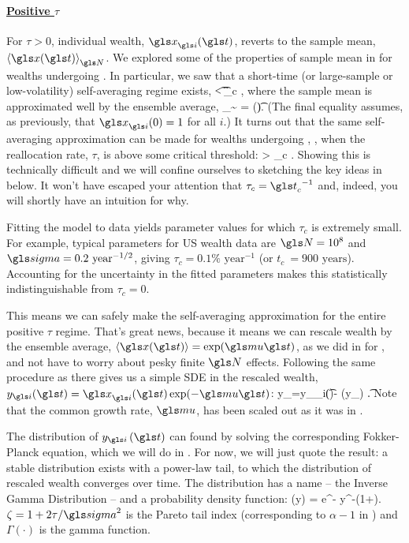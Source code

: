 \paragraph{\underline{Positive $\tau$}}
\mbox{}

For $\tau>0$, individual wealth, $\x_\gi(\t)$, reverts to the sample mean, $\ave{\x(\t)}_\N$. We explored some of the properties of sample mean in  for wealths undergoing \GBM. In particular, we saw that a short-time (or large-sample or low-volatility) self-averaging regime exists,
\be
\t < \t_c \equiv {},
\ee
where the sample mean is approximated well by the ensemble average,
\be
\ave{\x(\t)}_\N \sim \ave{\x(\t)} = \exp(\gmu \t).
\ee
(The final equality assumes, as previously, that $\x_\gi(0)=1$ for all $i$.) It turns out that the same self-averaging approximation can be made for wealths undergoing \RGBM, , when the reallocation rate, $\tau$, is above some critical threshold:
\be
\tau > \tau_c \equiv {}.
\ee
Showing this is technically difficult \cite{Bouchaud2015b} and we will confine ourselves to sketching the key ideas in  below. It won't have escaped your attention that $\tau_c={\t_c}^{-1}$ and, indeed, you will shortly have an intuition for why. 

Fitting the model to data yields parameter values for which $\tau_c$ is extremely small. For example, typical parameters for US wealth data are $\N=10^8$ and $\gsigma=0.2\text{ year}^{-1/2}$, giving $\tau_c = 0.1\%\text{ year}^{-1}$ (or $t_c\ = 900\text{ years}$). Accounting for the uncertainty in the fitted parameters makes this statistically indistinguishable from $\tau_c=0$.

This means we can safely make the self-averaging approximation for the entire positive $\tau$ regime. That's great news, because it means we can rescale wealth by the ensemble average, $\ave{\x(\t)}=\exp(\gmu \t)$, as we did in  for \GBM, and not have to worry about pesky finite $\N$ effects. Following the same procedure as there gives us a simple SDE in the rescaled wealth, $y_\gi(\t) = \x_\gi(\t)\exp(-\gmu \t)$:
\be
\gd y_\gi=y_\gi \gsigma \gd\gW_i\left(\t\right)- \tau (y_) \gd\t.
\ee
Note that the common growth rate, $\gmu$, has been scaled out as it was in .

The distribution of $y_\gi\left(\t\right)$ can found by solving the corresponding Fokker-Planck equation, which we will do in . For now, we will just quote the result: a stable distribution exists with a power-law tail, to which the distribution of rescaled wealth converges over time. The distribution has a name -- the Inverse Gamma Distribution -- and a probability density function:
\be
{}\left(y\right) = \frac{\left(\zeta-1\right)^\zeta}{\Gamma\left(\zeta\right)} e^{-} y^{-\left(1+\zeta\right)}.
\ee
$\zeta=1+2\tau/\gsigma^2$ is the Pareto tail index (corresponding to $\alpha-1$ in ) and $\Gamma\left(\cdot\right)$ is the gamma function.

